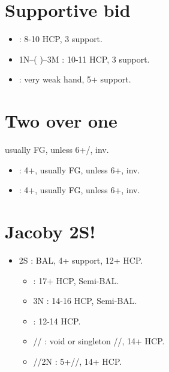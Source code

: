 \documentclass[12pt,twoside,a5paper]{report}%
\begin{document}
	\section*{Supportive bid}
		\begin{itemize}
		\renewcommand{\labelitemi}{}
		\item {} : 8-10 HCP, 3\he{} support.
		\item 1N--( )--3M : 10-11 HCP, 3\he{} support.
		\item {} : very weak hand, 5+\he{} support.
		\end{itemize}

	\section*{Two over one}
		usually FG, unless 6+\cl{}/\di{}, inv.
		\begin{itemize}
		\renewcommand{\labelitemi}{}
		\item {} : 4+\cl{}, usually FG, unless 6+\cl{}, inv.
		\item {} : 4+\di{}, usually FG, unless 6+\di{}, inv.
		\end{itemize}
	
	\section*{Jacoby 2S!}
		\begin{itemize}
		\renewcommand{\labelitemi}{}
		\item 2S : BAL, 4+\he{} support, 12+ HCP.
			\begin{itemize}
			\renewcommand{\labelitemi}{--}
			\item {} : 17+ HCP, Semi-BAL.
			\item 3N : 14-16 HCP, Semi-BAL.
			\item {} : 12-14 HCP.
			\item {}// : void or singleton //, 14+ HCP.
			\item {}//2N : 5+//, 14+ HCP.
			\end{itemize}
		\end{itemize}
\end{document}

